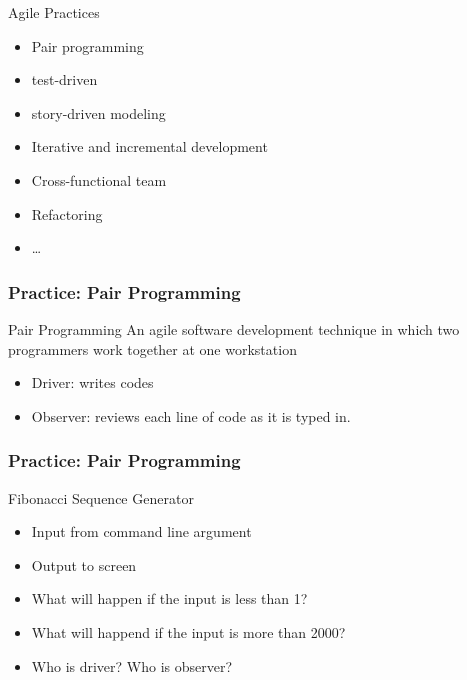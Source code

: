 \documentclass[UTF8]{beamer}
\begin{document}
\begin{frame}
  \begin{block}{Agile Practices}
    \begin{itemize}
      \item Pair programming
      \item test-driven
      \item story-driven modeling
      \item Iterative and incremental development
      \item Cross-functional team
      \item Refactoring
      \item \ldots
    \end{itemize}
  \end{block}
\end{frame}

\begin{frame}
  \frametitle{Practice: Pair Programming}
  \begin{block}{Pair Programming}
    An agile software development technique in which two programmers work together
    at one workstation
    \begin{itemize}
      \item Driver: writes codes
      \item Observer: reviews each line of code as it is typed in.
    \end{itemize}
  \end{block}
\end{frame}


\begin{frame}
  \frametitle{Practice: Pair Programming}
  \begin{block}{Fibonacci Sequence Generator}
    \begin{itemize}
      \item Input from command line argument
      \item Output to screen
      \item What will happen if the input is less than 1?
      \item What will happend if the input is more than 2000?
      \item Who is driver? Who is observer?
    \end{itemize}
  \end{block}
\end{frame}
\end{document}
